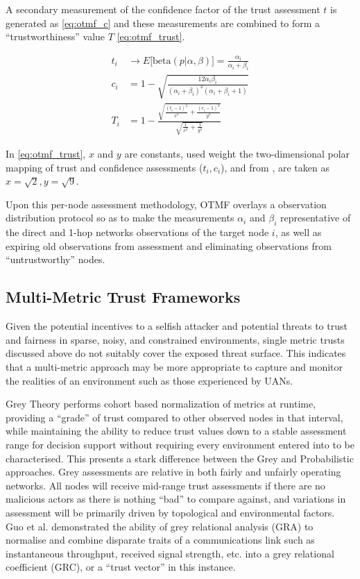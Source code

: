 \documentclass[conference]{IEEEtran}
\begin{document}
A secondary measurement of the confidence factor of the trust assessment $t$ is generated as \eqref{eq:otmf_c} and these measurements are combined to form a ``trustworthiness'' value $T$ \eqref{eq:otmf_trust}.

\begin{align}
  t_i &\to E\lbrack\text{beta}(p|\alpha,\beta)\rbrack = \frac{\alpha_i}{\alpha_i+\beta_i} \label{eq:otmf_t}\\[5pt]
  c_i &= 1 - \sqrt{\frac{12\alpha_i\beta_i}{(\alpha_i+\beta_i)^2(\alpha_i+\beta_i+1)}} \label{eq:otmf_c}\\[5pt]
  T_i &= 1 - \frac{\sqrt{\frac{(t_i-1)^2}{x^2} + \frac{(c_i-1)^2}{y^2}}}{\sqrt{\frac{1}{x^2}+\frac{1}{y^2}}} \label{eq:otmf_trust}
\end{align}

In \eqref{eq:otmf_trust}, $x$ and $y$ are constants, used weight the two-dimensional polar mapping of trust and confidence assessments ($t_i,c_i$), and from \cite{Zouridaki2005}, are taken as $x=\sqrt{2},y=\sqrt{9}$.

Upon this per-node assessment methodology, OTMF overlays a observation distribution protocol so as to make the measurements $\alpha_i$ and $\beta_i$ representative of the direct and 1-hop networks observations of the target node $i$, as well as expiring old observations from assessment and eliminating observations from ``untrustworthy'' nodes.


\subsection{Multi-Metric Trust Frameworks}\label{sec:multimetrictrust}

Given the potential incentives to a selfish attacker and potential threats to trust and fairness in sparse, noisy, and constrained environments, single metric trusts discussed above do not suitably cover the exposed threat surface. 
This indicates that a multi-metric approach may be more appropriate to capture and monitor the realities of an environment such as those experienced by UANs.

Grey Theory performs cohort based normalization of metrics at runtime, providing a ``grade'' of trust compared to other observed nodes in that interval, while maintaining the ability to reduce trust values down to a stable assessment range for decision support without requiring every environment entered into to be characterised.
This presents a stark difference between the Grey and Probabilistic approaches.
Grey assessments are relative in both fairly and unfairly operating networks.
All nodes will receive mid-range trust assessments if there are no malicious actors as there is nothing ``bad'' to compare against, and variations in assessment will be primarily driven by topological and environmental factors.
Guo et al. \cite{Guo11} demonstrated the ability of grey relational analysis (GRA) \cite{Zuo1995} to normalise and combine disparate traits of a communications link such as instantaneous throughput, received signal strength, etc. into a grey relational coefficient (GRC), or a ``trust vector'' in this instance.
\end{document}
